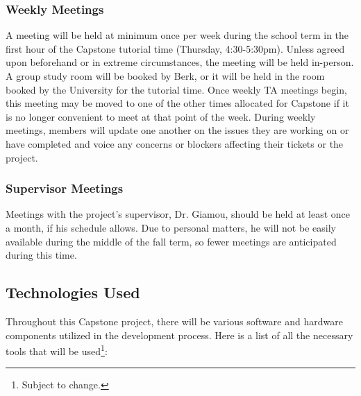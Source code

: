 \documentclass[11pt]{article}
\begin{document}
		\subsubsection{Weekly Meetings}
			A meeting will be held at minimum once per week during the school term in the first hour of the Capstone tutorial time (Thursday, 4:30-5:30pm). Unless agreed upon beforehand or in extreme circumstances, the meeting will be held in-person. A group study room will be booked by Berk, or it will be held in the room booked by the University for the tutorial time. Once weekly TA meetings begin, this meeting may be moved to one of the other times allocated for Capstone if it is no longer convenient to meet at that point of the week. During weekly meetings, members will update one another on the issues they are working on or have completed and voice any concerns or blockers affecting their tickets or the project.
		\subsubsection{Supervisor Meetings}
			Meetings with the project’s supervisor, Dr. Giamou, should be held at least once a month, if his schedule allows. Due to personal matters, he will not be easily available during the middle of the fall term, so fewer meetings are anticipated during this time. 
		\subsection{Technologies Used} %
			Throughout this Capstone project, there will be various software and hardware components utilized in the development process. Here is a list of all the necessary tools that will be used\footnote{Subject to change.}: 
			
\end{document}
